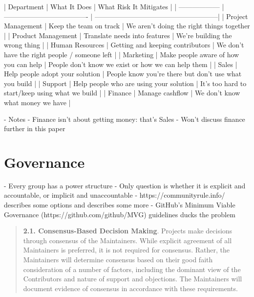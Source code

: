 \documentclass[10pt,letterpaper]{article}
\begin{document}
| Department         | What It Does                            | What Risk It Mitigates                                |
| ------------------ | -------------------------------------   | ------------------------------------------------------|
| Project Management | Keep the team on track                  | We aren't doing the right things together             |
| Product Management | Translate needs into features           | We're building the wrong thing                        |
| Human Resources    | Getting and keeping contributors        | We don't have the right people / someone left         |
| Marketing          | Make people aware of how you can help   | People don't know we exist or how we can help them    |
| Sales              | Help people adopt your solution         | People know you're there but don't use what you build |
| Support            | Help people who are using your solution | It's too hard to start/keep using what we build       |
| Finance            | Manage cashflow                         | We don't know what money we have                      |

- Notes
  - Finance isn't about getting money: that's Sales
  - Won't discuss finance further in this paper

\section{Governance}

- Every group has a power structure
  - Only question is whether it is explicit and accountable, or implicit and unaccountable \cite{Freeman1972}
- https://communityrule.info/ describes some options and \cite{Fogel2021} describes some more
- GitHub's Minimum Viable Governance (https://github.com/github/MVG) guidelines ducks the problem

\begin{quotation}
  \textbf{2.1. Consensus-Based Decision Making}.
  Projects make decisions through consensus of the Maintainers.
  While explicit agreement of all Maintainers is preferred, it is not required for consensus.
  Rather, the Maintainers will determine consensus based on their good faith consideration of a number of factors,
  including the dominant view of the Contributors and nature of support and objections.
  The Maintainers will document evidence of consensus in accordance with these requirements.
\end{quotation}
\end{document}
